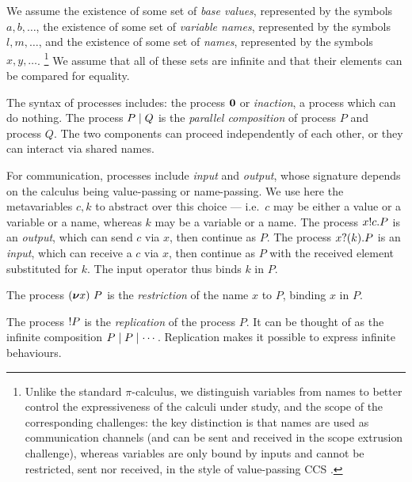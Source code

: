 \documentclass[runningheads]{llncs}
\begin{document}
We assume the existence of some set of \emph{base values}, represented by the symbols
\( a, b, \dots \), the existence of some set
of \emph{variable names}, represented by the symbols
\( l, m, \dots \), and the existence of some set of \emph{names},
represented by the symbols \( x, y, \dots \).%
\footnote{%
  Unlike the standard $\pi$-calculus, we distinguish variables from names to
  better control the expressiveness of the calculi under study, and the scope of
  the corresponding challenges: the key distinction is that names are used as communication channels (and can be sent and received in the scope extrusion challenge), whereas variables are only bound by inputs and cannot be restricted, sent nor received, in the style of value-passing CCS \cite{Milner1989}.%
} %
We assume that all of these sets are infinite and that their elements can be
compared for equality.

The syntax of processes includes:
the process \( \bm{0} \) or \emph{inaction}, a process which can do nothing. The process \( P \mid Q \) is the \emph{parallel composition} of process \( P \) and process \( Q \).
The two components can proceed independently of each other, or they can interact via shared names.

For communication, processes include \emph{input} and \emph{output}, whose
signature depends on the calculus being value-passing or name-passing.
We use here the metavariables $c,k$ to abstract over this choice
--- i.e.~$c$ may be either a value or a variable or a name, whereas $k$ may
be a variable or a name.
The process \( x ! c . P \) is an \emph{output}, which can send
\( c \) via \( x \), then continue as \( P \).  %
The process \( x ? (k) . P \) is an \emph{input}, which can receive a $c$
via \( x \), then continue as \( P \) with the received element
substituted for \( k \).  The input operator thus
binds \( k \) in \( P \).

The process \( (\bm{\nu} x)~P \) is the \emph{restriction} of the name
\( x \) to \( P \), binding \( x \) in \( P \).


The process \( {!}P \) is the \emph{replication} of the process \( P \).
It can be thought of as the infinite composition \( P \mid P \mid \cdots \).
Replication makes it possible to express infinite behaviours.
\end{document}
